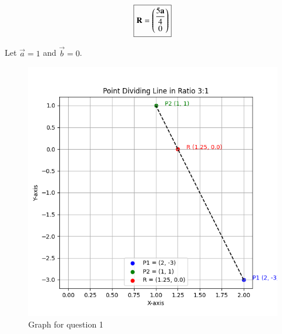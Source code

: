 \documentclass[journal]{IEEEtran}
\begin{document}
\begin{align}
\boxed{\mathbf{R} = \begin{pmatrix}\dfrac{5\mathbf{a}}{4} \\ 0\end{pmatrix}}
\end{align}

Let $\vec{a}=1$ and $\vec{b}=0$.

\begin{figure}[ht!]
\centering
\includegraphics[height=0.5\textheight, keepaspectratio]{figs/q1.png}
\caption{Graph for question 1}
\end{figure}
\end{document}
